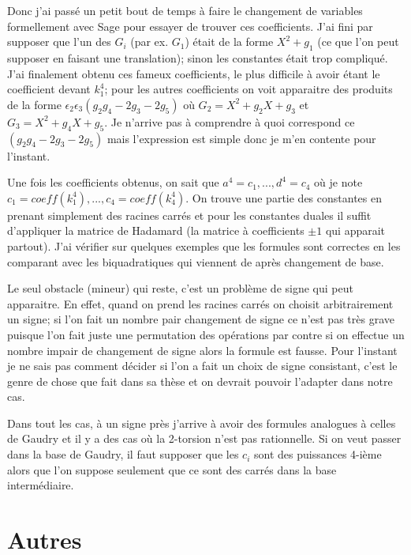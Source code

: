 \documentclass[a4paper]{article}
\theoremstyle{definition}
\theoremstyle{remark}
\numberwithin{equation}{section}
\begin{document}
Donc j'ai passé un petit bout de temps à faire le changement de variables formellement avec Sage pour essayer de trouver ces coefficients. J'ai fini par supposer que l'un des $G_i$ (par ex. $G_1$) était de la forme $X^2 + g_1$ (ce que l'on peut supposer en faisant une translation); sinon les constantes était trop compliqué. J'ai finalement obtenu ces fameux coefficients, le plus difficile à avoir étant le coefficient devant $k_1^4$; pour les autres coefficients on voit apparaitre des produits de la forme $\epsilon_2\epsilon_3(g_2g_4 - 2g_3 - 2g_5)$ où $G_2 = X^2+g_2X+g_3$ et $G_3 = X^2+g_4X+g_5$. Je n'arrive pas à comprendre à quoi correspond ce $(g_2g_4 - 2g_3 - 2g_5)$ mais l'expression est simple donc je m'en contente pour l'instant.

Une fois les coefficients obtenus, on sait que $a^4 = c_1, ... , d^4 = c_4$ où je note $c_1 = coeff(k_1^4), ..., c_4 = coeff(k_4^4)$.
On trouve une partie des constantes en prenant simplement des racines carrés et pour les constantes duales il suffit d'appliquer la matrice de Hadamard (la matrice à coefficients $\pm 1$ qui apparait partout).
J'ai vérifier sur quelques exemples que les formules sont correctes en les comparant avec les biquadratiques qui viennent de \citep{cassels-Flynn} après changement de base.

Le seul obstacle (mineur) qui reste, c'est un problème de signe qui peut apparaitre. En effet, quand on prend les racines carrés on choisit arbitrairement un signe; si l'on fait un nombre pair changement de signe ce n'est pas très grave puisque l'on fait juste une permutation des opérations par contre si on effectue un nombre impair de changement de signe alors la formule est fausse. Pour l'instant je ne sais pas comment décider si l'on a fait un choix de signe consistant, c'est le genre de chose que fait \citet{cosset} dans sa thèse et on devrait pouvoir l'adapter dans notre cas.

Dans tout les cas, à un signe près j'arrive à avoir des formules analogues à celles de Gaudry et il y a des cas où la 2-torsion n'est pas rationnelle. Si on veut passer dans la base de Gaudry, il faut supposer que les $c_i$ sont des puissances 4-ième alors que l'on suppose seulement que ce sont des carrés dans la base intermédiaire.

\section{Autres}
\end{document}
